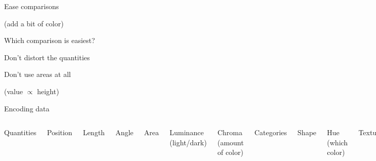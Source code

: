 \documentclass[aspectratio=169,12pt,t]{beamer}
\begin{document}
\begin{frame}{Ease comparisons}

\hilit (add a bit of color)

\bigskip


\note{
}
\end{frame}




\begin{frame}[c]{Which comparison is easiest?}


\note{
}
\end{frame}


\begin{frame}{Don't distort the quantities}

{\hilit
}

\bigskip


\note{
}
\end{frame}



\begin{frame}{Don't use areas at all}

{\hilit
  (value $\propto$ height)
}

\bigskip


\note{
}
\end{frame}





\begin{frame}{Encoding data}

\begin{columns}

{\hilit Quantities}

\bi
\item Position
\item Length
\item Angle
\item Area
\item Luminance {\lolit (light/dark)}
\item Chroma {\lolit (amount of color)}
\ei


{\hilit Categories}

\bi
\item Shape
\item Hue {\lolit (which color)}
\item Texture
\item Width
\ei

  \end{columns}

\note{
}
\end{frame}
\end{document}
